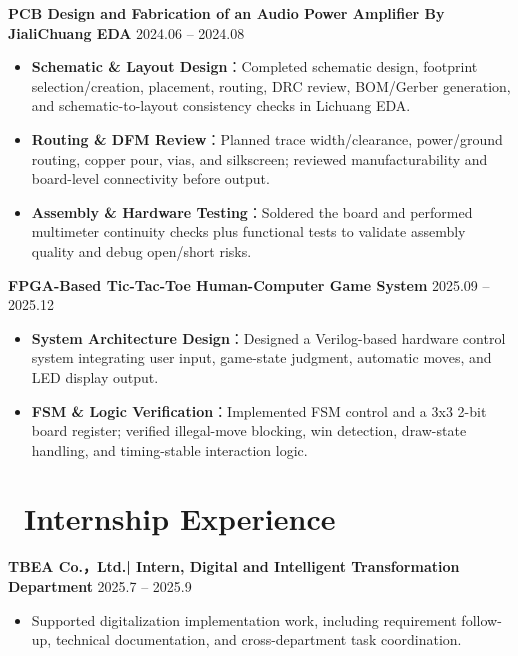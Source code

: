 \documentclass[11pt]{article}
\newlength{\interProjectSpacing}
\newcommand{\projectsep}{\vspace{\interProjectSpacing}}
\newlength{\intraProjectTitleSep}
\newcommand{\titlebreak}{\\[\intraProjectTitleSep]}
\newlength{\intraProjectListTopSep}
\begin{document}
\textbf{PCB Design and Fabrication of an Audio Power Amplifier By JialiChuang EDA } \hfill 2024.06 – 2024.08
\begin{itemize}[nosep, topsep=\intraProjectListTopSep]
    \item \textbf{Schematic \& Layout Design}：Completed schematic design, footprint selection/creation, placement, routing, DRC review, BOM/Gerber generation,
and schematic-to-layout consistency checks in Lichuang EDA.
    \item \textbf{Routing \& DFM Review}：Planned trace width/clearance, power/ground routing, copper pour, vias, and silkscreen; reviewed manufacturability and
board-level connectivity before output.
    \item \textbf{Assembly \& Hardware Testing}：Soldered the board and performed multimeter continuity checks plus functional tests to validate assembly quality and
debug open/short risks.
\end{itemize}


\textbf{FPGA-Based Tic-Tac-Toe Human-Computer Game System} \hfill 2025.09 -- 2025.12 
\begin{itemize}[nosep, topsep=\intraProjectListTopSep]
    \item \textbf{System Architecture Design}：Designed a Verilog-based hardware control system integrating user input, game-state judgment, automatic moves, and LED display output.
    \item \textbf{FSM \& Logic Verification}：Implemented FSM control and a 3x3 2-bit board register; verified illegal-move blocking, win detection, draw-state handling, and timing-stable interaction logic.
\end{itemize}

\section{\makebox[\widthof{\faUsers}][c]{\color{CVBlue}\faUsers}\ Internship Experience}

\textbf{TBEA Co.，Ltd.| Intern, Digital and Intelligent Transformation Department } \hfill 2025.7 -- 2025.9
\begin{itemize}[nosep, topsep=\intraProjectListTopSep]
    \item \textbf{}Supported digitalization implementation work, including requirement follow-up, technical documentation, and cross-department task coordination.
\end{itemize}
\end{document}
